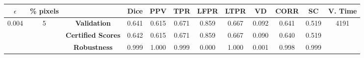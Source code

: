 \begin{longtable}{ c  c | c | c  c  c  c  c  c  c c c}
\toprule \textbf{$\epsilon$} & \textbf{\% pixels} & & \textbf{Dice} & \textbf{PPV} & \textbf{TPR} & \textbf{LFPR} & \textbf{LTPR} & \textbf{VD} & \textbf{CORR} & \textbf{SC} & \textbf{V. Time} \\
\midrule 
\multirow{3}{*}{0.004}  & \multirow{3}{*}{5} &\textbf{Validation} & 0.641 & 0.615 & 0.671 & 0.859 & 0.667 & 0.092 & 0.641 & 0.519 & \multirow{3}{*}{4191} \\
 & & \textbf{Certified Scores} & 0.642 & 0.615 & 0.671 & 0.859 & 0.667 & 0.090 & 0.640 & 0.519 & \\
& & \textbf{Robustness} & 0.999 & 1.000 & 0.999 & 0.000 & 1.000 & 0.001 & 0.998 & 0.999 & \\
\end{longtable}